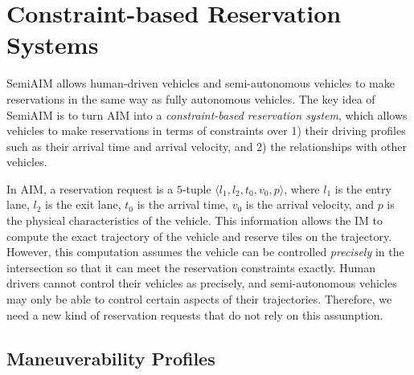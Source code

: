 \section{Constraint-based Reservation Systems}
\label{sec:constraint}

SemiAIM allows human-driven vehicles and semi-autonomous vehicles to
make reservations in the same way as fully autonomous vehicles.  The
key idea of SemiAIM is to turn AIM into a \emph{constraint-based
reservation system}, which allows vehicles to make reservations in
terms of constraints over 1) their driving profiles such as their
arrival time and arrival velocity, and 2) the relationships with other
vehicles.

In AIM, a reservation request is a $5$-tuple $\langle l_1, l_2, t_0,
v_0, p\rangle$, where $l_1$ is the entry lane, $l_2$ is the exit lane,
$t_0$ is the arrival time, $v_0$ is the arrival velocity, and $p$ is
the physical characteristics of the vehicle.  This information allows
the IM to compute the exact trajectory of the vehicle and reserve
tiles on the trajectory.  However, this computation
assumes the vehicle can be controlled \emph{precisely} in the
intersection so that it can meet the reservation constraints exactly.
Human drivers cannot control their vehicles as precisely, and
semi-autonomous vehicles may only be able to control certain aspects
of their trajectories.  Therefore, we need a new kind of reservation
requests that do not rely on this assumption.

\subsection{Maneuverability Profiles}

